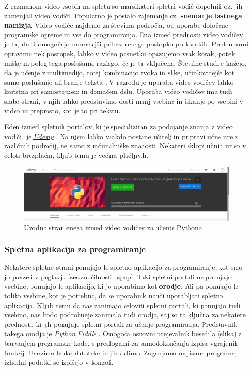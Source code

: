 Z razmahom video vsebin na spletu so marsikateri spletni vodič
dopolnili oz. jih zamenjali video vodiči. Popularno je postalo
zajemanje oz. \textbf{snemanje lastnega namizja}. Video vodiče najdemo
za številna področja, od uporabe določene programske opreme in vse do
programiranja. Ena izmed prednosti video vodičev je
ta, da ti omogočajo nazornejši prikaz nekega postopka po
korakih. Preden sami opravimo nek postopek, lahko v video posnetku
opazujemo vsak korak, potek miške in poleg tega poslušamo razlago, če
je ta vključena. Številne študije kažejo, da je učenje z multimedijo,
torej kombinacijo zvoka in slike,  učinkovitejše kot samo poslušanje ali
branje teksta \cite{web:multimediaL}. V razredu je uporaba video
vodičev lahko koristna pri samostojnem in domačem delu. Uporaba
video vodičev ima tudi slabe strani, v njih lahko predstavimo dosti
manj vsebine in iskanje po vsebini v video ni preprosto, kot je to pri
tekstu.

Eden izmed spletnih portalov, ki je specializiran za podajanje znanja
z video vodiči, je \emph{\href{https://www.udemy.com}{Udemy}}
\cite{web:udemy}. Na njem lahko vsakdo  postane učitelj in pripravi
učne ure z različnih področij, ne samo z računalniške
znanosti. Nekateri sklopi učnih ur so v celoti brezplačni, kljub temu
je večina plačljivih.

\begin{figure}[h!]
    \includegraphics [width=1\linewidth, keepaspectratio =
    1] {./images/sc_web/udemy_01.jpg}
    \caption{Uvodna stran enega izmed video vodičev za učenje Pythona
      \cite{web:udemy}.}
    \label{fig:scr:web:udemy}
\end{figure}

\subsubsection{Spletna aplikacija za programiranje}
\label{sec:spletna_app_programiranje}

Nekatere spletne strani ponujajo le spletno aplikacijo za
programiranje, kot smo jo povzeli v poglavju
\ref{sec:značilnosti_spup}. Taki spletni portali ne ponujajo vsebine,
ponujajo le aplikacijo, ki jo uporabimo kot \textbf{orodje}. Ali pa
ponujajo le toliko vsebine, kot je potrebno, da se uporabnik nauči
uporabljati spletno aplikacijo. Kljub temu da nas zanimajo celoviti
spletni portali, ki ponujajo tudi vsebino, nas bodo podrobneje
zanimala tudi orodja, saj so ta ključna za nekatere prednosti, ki jih
ponujajo spletni portali za učenje programiranja. Predstavnik takega
orodja je \emph{\href{http://pythonfiddle.com/}{Python Fiddle}}
\cite{web:pythonfiddle}. Omogoča osnovni urejevalnik besedila (slika)
z barvanjem programske kode, s predlogami za samodokončanja izpisa
vgrajenih funkcij. Uvozimo lahko datoteke in jih delimo. Zaganjamo
napisane programe, izhodni podatki se izpišejo v konzoli.

